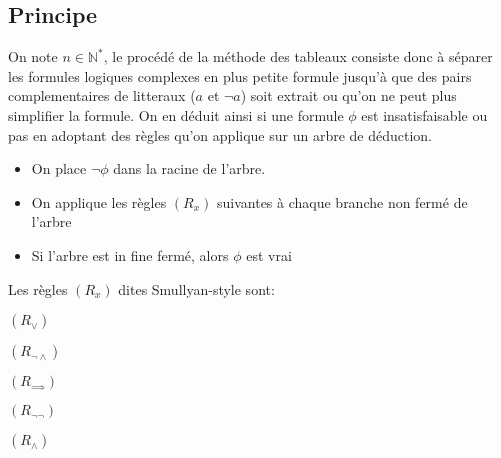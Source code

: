 \documentclass{paper}
\begin{document}
\subsection{Principe}
On note $n\in\mathbb{N}^*$, le procédé de la méthode des tableaux consiste donc à séparer les formules logiques complexes en plus petite formule jusqu'à que des pairs complementaires de litteraux ($a$ et $\lnot a$) soit extrait ou qu'on ne peut plus simplifier la formule.
On en déduit ainsi si une formule $\phi$ est insatisfaisable ou pas en adoptant des règles qu'on applique sur un arbre de déduction.
\begin{itemize}
    \item On place $\lnot\phi$ dans la racine de l'arbre.
    \item On applique les règles $(R_x)$ suivantes à chaque branche non fermé de l'arbre
    \item Si l'arbre est in fine fermé, alors $\phi$ est vrai
\end{itemize}

Les règles $(R_x)$ dites Smullyan-style sont:

$(R_\lor)$
$(R_{\lnot\land})$
$(R_{\implies})$
$(R_{\lnot\lnot})$
$(R_{\land})$
\end{document}
